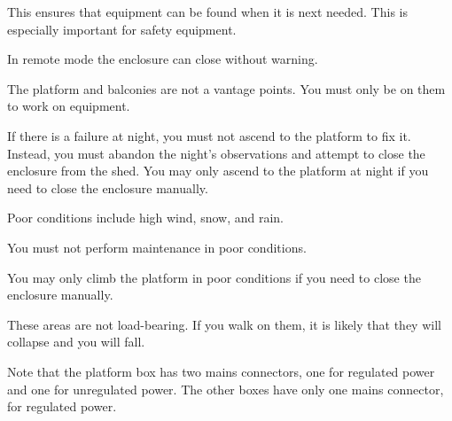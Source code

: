 
This ensures that equipment can be found when it is next needed. This is especially important for safety equipment.


In remote mode the enclosure can close without warning.


The platform and balconies are not a vantage points. You must only be on them to work on equipment.


If there is a failure at night, you must not ascend to the platform to fix it. Instead, you must abandon the night’s observations and attempt to close the enclosure from the shed. You may only ascend to the platform at night if you need to close the enclosure manually.


Poor conditions include high wind, snow, and rain. 

You must not perform maintenance in poor conditions.

You may only climb the platform in poor conditions if you need to close the enclosure manually.


These areas are not load-bearing. If you walk on them, it is likely that they will collapse and you will fall.



Note that the platform box has two mains connectors, one for regulated power and one for unregulated power. The other boxes have only one mains connector, for regulated power.

